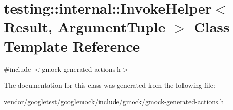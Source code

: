 \hypertarget{classtesting_1_1internal_1_1InvokeHelper}{}\section{testing\+:\+:internal\+:\+:Invoke\+Helper$<$ Result, Argument\+Tuple $>$ Class Template Reference}
\label{classtesting_1_1internal_1_1InvokeHelper}


{\ttfamily \#include $<$gmock-\/generated-\/actions.\+h$>$}



The documentation for this class was generated from the following file\+:\begin{DoxyCompactItemize}
\item 
vendor/googletest/googlemock/include/gmock/\hyperlink{gmock-generated-actions_8h}{gmock-\/generated-\/actions.\+h}\end{DoxyCompactItemize}
